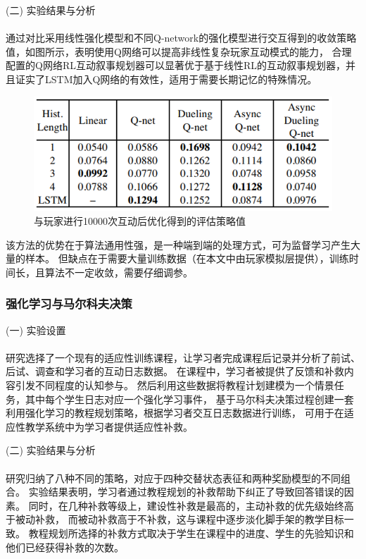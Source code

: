\documentclass{article}
\begin{document}
            (二) 实验结果与分析\paragraph{}
            通过对比采用线性强化模型和不同Q-network的强化模型进行交互得到的收敛策略值，如图所示，表明使用Q网络可以提高非线性复杂玩家互动模式的能力，
            合理配置的Q网络RL互动叙事规划器可以显著优于基于线性RL的互动叙事规划器，并且证实了LSTM加入Q网络的有效性，适用于需要长期记忆的特殊情况。
            \begin{figure}[H]
            	
            	\centering
            	\includegraphics[scale=0.6]{images/policy_value.png}
            	\caption{与玩家进行10000次互动后优化得到的评估策略值}
            	\label{fig:label}
            \end{figure}

            该方法的优势在于算法通用性强，是一种端到端的处理方式，可为监督学习产生大量的样本。
            但缺点在于需要大量训练数据（在本文中由玩家模拟层提供），训练时间长，且算法不一定收敛，需要仔细调参。

            \subsubsection{强化学习与马尔科夫决策}
            (一) 实验设置\paragraph{}
            研究选择了一个现有的适应性训练课程，让学习者完成课程后记录并分析了前试、后试、调查和学习者的互动日志数据。
            在课程中，学习者被提供了反馈和补救内容引发不同程度的认知参与。
            然后利用这些数据将教程计划建模为一个情景任务，其中每个学生日志对应一个强化学习事件，
            基于马尔科夫决策过程创建一套利用强化学习的教程规划策略，根据学习者交互日志数据进行训练，
            可用于在适应性教学系统中为学习者提供适应性补救。

            (二) 实验结果与分析\paragraph{}
            研究归纳了八种不同的策略，对应于四种交替状态表征和两种奖励模型的不同组合。
            实验结果表明，学习者通过教程规划的补救帮助下纠正了导致回答错误的因素。
            同时，在几种补救等级上，建设性补救是最高的，主动补救的优先级始终高于被动补救，
            而被动补救高于不补救，这与课程中逐步淡化脚手架的教学目标一致。
            教程规划所选择的补救方式取决于学生在课程中的进度、学生的先验知识和他们已经获得补救的次数。
\end{document}
